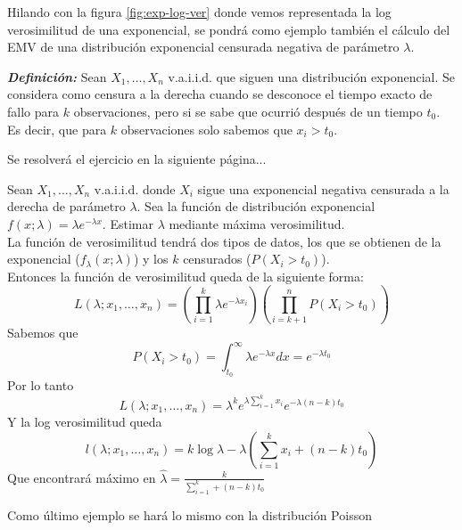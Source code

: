 \vspace{30pt}

Hilando con la figura \ref{fig:exp-log-ver} donde vemos representada la log verosimilitud de una exponencial, se pondrá como ejemplo también el cálculo del EMV de una distribución exponencial censurada negativa de parámetro $\lambda$.

\textbf{\textit{Definición: }} Sean $X_1, \dots, X_n$ v.a.i.i.d. que siguen una distribución exponencial. Se considera como censura a la derecha cuando se desconoce el tiempo exacto de fallo para $k$ observaciones, pero si se sabe que ocurrió después de un tiempo $t_0$. Es decir, que para $k$ observaciones solo sabemos que $x_i > t_0$.

\vspace{30pt}

Se resolverá el ejercicio en la siguiente página...

\newpage

\begin{exercise}
    Sean $X_1, \dots, X_n$ v.a.i.i.d. donde $X_i$ sigue una exponencial negativa censurada a la derecha de parámetro $\lambda$. Sea la función de distribución exponencial $f(x;\lambda)=\lambda e^{-\lambda x}$. Estimar $\lambda$ mediante máxima verosimilitud. \\
    La función de verosimilitud tendrá dos tipos de datos, los que se obtienen de la exponencial ($f_\lambda(x;\lambda)$) y los $k$ censurados ($P(X_i>t_0)$). \\
    Entonces la función de verosimilitud queda de la siguiente forma:
    \[
        L(\lambda; x_1,\dots,x_n)=\left(\prod_{i=1}^{k}\lambda e^{-\lambda x_i}\right)\left(\prod_{i=k+1}^{n}P(X_i>t_0)\right)
    \]
    Sabemos que
    \[
        P(X_i>t_0)=\int_{t_0}^\infty \lambda e^{-\lambda x}dx = e^{-\lambda t_0}
    \]
    Por lo tanto
    \[
        L(\lambda;x_1,\dots,x_n)=\lambda^k e^{\lambda \sum_{i=1}^{k}x_i}e^{-\lambda(n-k)t_0}
    \]
    Y la log verosimilitud queda
    \[
        l(\lambda;x_1,\dots,x_n)=k\log\lambda-\lambda\left(\sum_{i=1}^{k}x_i + (n-k)t_0\right)
    \]
    Que encontrará máximo en $\hat{\lambda} = \frac{k}{\sum_{i=1}^{k}+(n-k)t_0}$
\end{exercise}

Como último ejemplo se hará lo mismo con la distribución Poisson

